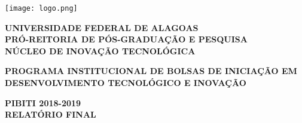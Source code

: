 \documentclass[a4paper,12pt]{article}
\begin{document}
\begin{center}

\texttt{[image: logo.png]} \hspace{30cm}

\vspace{0.5cm}

\textbf{\large{UNIVERSIDADE FEDERAL DE ALAGOAS}}\\
\textbf{PRÓ-REITORIA DE PÓS-GRADUAÇÃO E PESQUISA}\\
\textbf{NÚCLEO DE INOVAÇÃO TECNOLÓGICA}\\

\vspace{0.5cm}

\textbf{\large{PROGRAMA INSTITUCIONAL DE BOLSAS DE INICIAÇÃO EM
DESENVOLVIMENTO TECNOLÓGICO E INOVAÇÃO}}

\vspace{1.5cm}

\textbf{\Large{PIBITI 2018-2019}}\\
\textbf{\Large{RELATÓRIO FINAL}}\\
\vspace{0.5cm}


\end{center}
\end{document}
